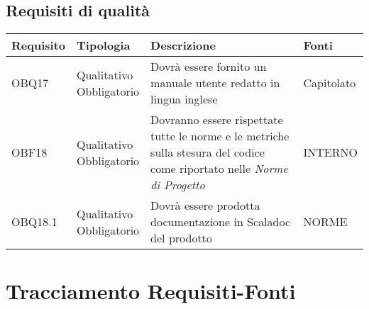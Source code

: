 \documentclass{scalatekids-article}
\begin{document}
\subsection{Requisiti di qualità}

\begin{longtable}[H]{|l|p{2cm}|p{6cm}|p{4cm}|}
  \hline
  \textbf{Requisito} & \textbf{Tipologia} & \textbf{Descrizione} & \textbf{Fonti}\\
  \hline
  OBQ17 & \multiLineCell{Qualitativo\\Obbligatorio} & Dovrà essere fornito un manuale utente redatto in lingua inglese & \multiLineCell{Capitolato\\}\\
  \hline
  OBF18 & \multiLineCell{Qualitativo\\Obbligatorio} & Dovranno essere rispettate tutte le norme e le metriche sulla stesura del codice come riportato nelle \textit{Norme di Progetto} & \multiLineCell{INTERNO\\}\\
  \hline
  OBQ18.1 & \multiLineCell{Qualitativo\\Obbligatorio} & Dovrà essere prodotta documentazione in Scaladoc del prodotto & \multiLineCell{NORME\\}\\
  \hline
\end{longtable}

\section{Tracciamento Requisiti-Fonti}
\end{document}
